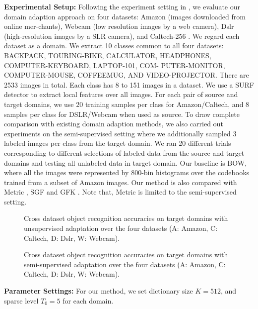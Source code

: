 \documentclass{article}
\begin{document}
\textbf{Experimental Setup:} Following the experiment setting in \cite{gong2012geodesic}, we evaluate our domain adaption approach on four datasets: Amazon (images downloaded from online mer-chants), Webcam (low resolution images by a web camera), Dslr (high-resolution images by a SLR camera), and Caltech-256 \cite{griffin2007caltech}. We regard each dataset as a domain. %
 We extract 10 classes common to all four datasets: BACKPACK, TOURING-BIKE, CALCULATOR, HEADPHONES, COMPUTER-KEYBOARD, LAPTOP-101, COM-  PUTER-MONITOR, COMPUTER-MOUSE, COFFEEMUG, AND VIDEO-PROJECTOR. There are 2533 images in total. Each class has 8 to 151 images in a dataset. We use a SURF detector \cite{bay2008speeded} to extract local features over all images. For each pair of source and target domains, we use 20 training samples per class for Amazon/Caltech, and 8 samples per class for DSLR/Webcam when used as source. To draw complete comparison with existing domain adaption methods, we also carried out experiments on the semi-supervised setting where we additionally sampled 3 labeled images per class from the target domain. We ran 20 different trials corresponding to different selections of labeled data from the source and target domains and testing all unlabeled data in target domain. Our baseline is BOW, where all the images were represented by 800-bin histograms over the codebooks trained from a subset of Amazon images. Our method is also compared with Metric \cite{saenko2010adapting}, SGF \cite{gopalan2011domain} and GFK \cite{gong2012geodesic}. Note that, Metric \cite{saenko2010adapting} is limited to the semi-supervised setting.

\begin{figure}[t]
\label{fig:fig3}
\centering {}
             \caption{Cross dataset object recognition accuracies on target domains with unsupervised adaptation over the four datasets (A: Amazon, C: Caltech, D: Dslr, W: Webcam).}
\end{figure}
             
\begin{figure}[t]
\label{fig:fig4}
\centering {}
             \caption{Cross dataset object recognition accuracies on target domains with semi-supervised adaptation over the four datasets (A: Amazon, C: Caltech, D: Dslr, W: Webcam).}
\end{figure}

\textbf{Parameter Settings:} For our method, we set dictionary size $K=512$, and sparse level $T_0=5$ for each domain.
\end{document}
